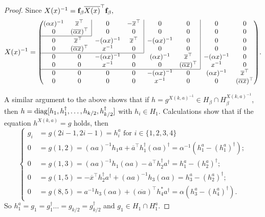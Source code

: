 \begin{proof}
Since $X(x)^{-1}={\bf f}_{\beta}\overline{X(x)}^{\top}{\bf f}_{\beta},$ 
\begin{equation*}
X(x)^{-1}= \Scale[0.93]{\begin{pmatrix} 
(\alpha x)^{-1}& \multicolumn{1}{c|}{\overline{x}^{\top}} & 0& \multicolumn{1}{c|}{-\overline{x}^{\top}}&0&\multicolumn{1}{c|}{0}&0&0\\
0&\multicolumn{1}{c|}{(\overline{\alpha x})^{\top}}& 0&\multicolumn{1}{c|}{0}&0&\multicolumn{1}{c|}{0}&0&0\\ \cline{1-2}
0& \overline{x}^{\top^{\phantom{1}}}& -(\alpha x)^{-1} &\multicolumn{1}{c|}{\overline{x}^{\top}}&-(\alpha x)^{-1}&\multicolumn{1}{c|}{0}&0&0\\
0 & (\overline{\alpha x})^{\top}&x^{-1}&\multicolumn{1}{c|}{0}&0&\multicolumn{1}{c|}{0}&0&0\\ \cline{1-4}
0&0&-(\alpha x)^{-1}&0&(\alpha x)^{-1}&\multicolumn{1}{c|}{\overline{x}^{\top}}&-(\alpha x)^{-1}&0\\
0& 0&x^{-1}&0&0&\multicolumn{1}{c|}{(\overline{\alpha x})^{\top}}&x^{-1}&0\\ \cline{1-6}
0&0&0&0&-(\alpha x)^{-1}&0&(\alpha x)^{-1}& \overline{x}^{\top}\\
0&0&0&0&x^{-1}&0&0& (\overline{\alpha x})^{\top}
\end{pmatrix}}.
\end{equation*}

A similar argument to the above shows that if $h =g^{X(k,a)^{-1}} \in H_{\beta} \cap H_{\beta}^{X(k,a)^{-1}}$, then $h=\mathrm{diag}[h_1, h_1^{\dagger}, \ldots, h_{k/2}, h_{k/2}^{\dagger}]$ with $h_i \in H_1.$ Calculations show that if the equation
$h^{X(k,a)}=g$  holds, then 
\begin{equation*}
\begin{cases}
g_i &  =  g(2i-1,2i-1)= h_i^a \text{ for } i \in \{1,2,3,4\} \\
0 & =  g(1,2)=(\alpha a)^{-1} h_1 a + \overline{a}^{\top} h_1^{\dagger} (\alpha a)^{\dagger}= {\alpha}^{-1}(h_1^a - (h_1^a)^{\dagger});\\
0 & =  g(1,3)=(\alpha a)^{-1} h_1 (\alpha a) - \overline{a}^{\top}h_2^{\dagger} a^{\dagger}=h_1^a - (h_2^a)^{\dagger};\\
0 & =  g(1,5)= - \overline{x}^{\top} h_2^{\dagger} a^{\dagger} +(\alpha a)^{-1} h_3 (\alpha a)= h_3^a - (h_2^a)^{\dagger};\\
0 & =  g(8,5)= a^{-1} h_3 (\alpha a) + (\overline{\alpha a})^{\top}h_4^{*} a^{\dagger}= \alpha (h_3^a - (h_4^a)^{\dagger}).
\end{cases}
\end{equation*}
So $h_1^a=g_1=g_1^{\dagger} \ldots = g_{k/2}= g_{k/2}^{\dagger}$ and $g_1 \in H_1 \cap H_1^a.$ 


\end{proof}
